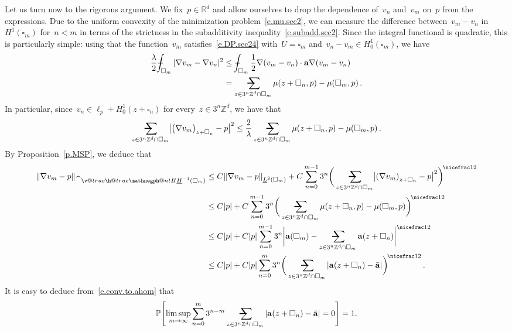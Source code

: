 \documentclass[11pt,twoside]{article} %
\makeatletter
\let\oldsquare\square %
\renewcommand{\square}{\oldsquare}
\numberwithin{equation}{section}
\theoremstyle{definition}
\let\originalleft\left
\let\originalright\right
\renewcommand{\left}{\mathopen{}\mathclose\bgroup\originalleft}
\renewcommand{\right}{\aftergroup\egroup\originalright}
\newcommand*{\Zd}{\ensuremath{\mathbb{Z}^d}}
\newcommand*{\Rd}{\ensuremath{\mathbb{R}^d}}
\renewcommand*{\hat}{\widehat}
\renewcommand{\a}{\mathbf{a}}
\newcommand{\ahom}{\bar{\a}}
\newcommand{\cu}{\square}
\renewcommand{\P}{\mathbb{P}}
\newcommand{\avsum}{\mathop{\mathpalette\avsuminner\relax}\displaylimits}
\newcommand\avsuminner[2]{%
  {\sbox0{$\m@th#1\sum$}%
   \vphantom{\usebox0}%
   \ooalign{%
     \hidewidth
     \smash{\,\rule[.23em]{8.8pt}{1.1pt} \relax}%
     \hidewidth\cr
   ~$\m@th#1\sum$\cr
   }%
  }%
}
\def\Xint#1{\mathchoice
{\XXint\displaystyle\textstyle{#1}}%
{\XXint\textstyle\scriptstyle{#1}}%
{\XXint\scriptstyle\scriptscriptstyle{#1}}%
{\XXint\scriptscriptstyle\scriptscriptstyle{#1}}%
\!\int}
\def\XXint#1#2#3{{\setbox0=\hbox{$#1{#2#3}{\int}$}
\vcenter{\hbox{$#2#3$}}\kern-.5\wd0}}
\def\fint{\Xint-}
\newcommand{\negphantom}{\v@true\h@true\negph@nt}
\newcommand{\negph@nt}{\ifmmode\expandafter\mathpalette 
  \expandafter\mathnegph@nt\else\expandafter\makenegph@nt\fi}
\newcommand{\makenegph@nt}[1]{%
  \setbox\z@\hbox{\color@begingroup#1\color@endgroup}\finnegph@nt}
\newcommand{\finnegph@nt}{%
  \setbox\tw@\null 
  \ifv@ \ht\tw@\ht\z@\dp\tw@\dp\z@\fi \ifh@\wd\tw@-\wd\z@\fi\box\tw@}
\newcommand{\mathnegph@nt}[2]{%
  \setbox\z@\hbox{$\m@th #1{#2}$}\finnegph@nt}
\newcommand{\Hminusul}{\hat{\phantom{H}}\negphantom{H}\underline{H}^{-1}}
\makeatother
\begin{document}
\smallskip

Let us turn now to the rigorous argument. We fix~$p\in\Rd$ and allow ourselves to drop the dependence of~$v_n$ and~$v_m$ on~$p$ from the expressions.
Due to the uniform convexity of the minimization problem~\eqref{e.mu.sec2}, we can measure the difference between~$v_m-v_n$ in~$H^1(\cu_m)$ for~$n<m$ in terms of the strictness in the subadditivity inequality~\eqref{e.subadd.sec2}. 
Since the integral functional is quadratic, this is particularly simple: using that the function~$v_m$ satisfies~\eqref{e.DP.sec24} with~$U=\cu_m$ and~$v_n-v_m\in H^1_0(\cu_m)$, we have
\begin{align}
\label{e.multiscale.snap}
\frac{\lambda}{2} \fint_{\cu_m} 
|\nabla v_m- \nabla v_n|^2
&
\leq 
\fint_{\cu_m} 
\frac12 \nabla (v_m-v_n) \cdot \a\nabla (v_m-v_n) 
\notag \\ &
=
\avsum_{z\in 3^n\Zd\cap \cu_m} 
\mu(z+\cu_n,p)
-
\mu(\cu_m,p) \,.
\end{align} 
In particular, since~$v_n \in \ell_p+ H^1_0(z+\cu_n)$ for every~$z\in 3^n\Zd$, we have that 
\begin{equation*}
\avsum_{z\in 3^n\Zd\cap \cu_m} 
\bigl| \bigl( \nabla v_m \bigr)_{z+\cu_n} - p \bigr|^2
\leq 
\frac{2}{\lambda} 
\avsum_{z\in 3^n\Zd\cap \cu_m} 
\mu(z+\cu_n,p)
-
\mu(\cu_m,p) \,.
\end{equation*}
By Proposition~\ref{p.MSP}, we deduce that 
\begin{align}
\left\| \nabla v_m - p \right\|_{\Hminusul(\cu_m)}
&
\leq
C
\left\| \nabla v_m - p \right\|_{ \underline{L}^2(\cu_m)} 
+
C 
\sum_{n=0}^{{m-1}} 3^{n} 
\biggl( \, \avsum_{z\in 3^n\Zd\cap \cu_{m}} 
\left| \left( \nabla v_m  \right)_{z+\cu_n} - p \right|^2 \biggr)^{\!\nicefrac12}
\notag \\ & 
\leq 
C|p|
+ 
C 
\sum_{n=0}^{{m-1}} 3^{n} 
\biggl( \, \avsum_{z\in 3^n\Zd\cap \cu_{m}} 
\mu(z+\cu_n,p)
-
\mu(\cu_m,p) 
\biggr)^{\!\nicefrac12}
\notag \\ & 
\leq 
C|p|
+ 
C|p|
\sum_{n=0}^{{m-1}} 3^{n} 
\biggl| 
 \a(\cu_m)-
\avsum_{z\in 3^n\Zd\cap \cu_{m}} 
\a(z+\cu_n)
\biggr|^{\nicefrac12}
\label{e.flatnessqual.sec24}
\\ & 
\leq 
C|p|
+ 
C |p|
\sum_{n=0}^{{m}} 3^{n} 
\biggl( \, \avsum_{z\in 3^n\Zd\cap \cu_{m}} 
| \a(z+\cu_n)
-
\ahom |
\biggr)^{\!\nicefrac12}
\label{e.flatnessqual.sec24.giveup}
\,.
\end{align}
It is easy to deduce from~\eqref{e.conv.to.ahom} that 
\begin{equation}
\label{e.multiscalequant.sec24}
\P \Biggl[
\limsup_{m\to\infty} 
\sum_{n=0}^{{m}} 3^{n-m} 
\avsum_{z\in 3^n\Zd\cap \cu_{m}} 
| \a(z+\cu_n)
-
\ahom |
= 0
\Biggr] = 1. 
\end{equation}
\end{document}
